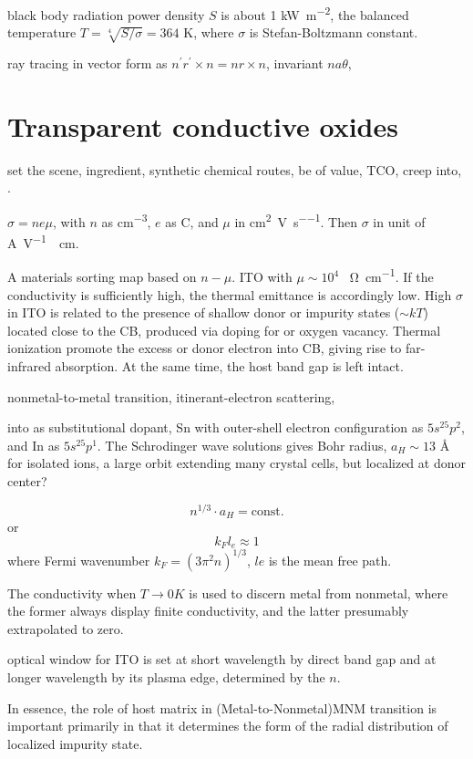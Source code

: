 black body radiation power density $S$ is about 1 \si{kW\per m^2}, the balanced temperature $T = \sqrt[4]{S/\sigma} = 364$ K, where $\sigma$ is Stefan-Boltzmann constant. 

ray tracing in vector form as $n^{\prime} r^{\prime} \times n = n r \times n$, invariant $na\theta$, 


\section{Transparent conductive oxides}

set the scene, ingredient, synthetic chemical routes, be of value, TCO, creep into, . \cite{Edwards2004}

$\sigma = ne\mu$, with $n$ as \si{cm^{-3}}, $e$ as C, and $\mu$ in \si{cm^2\per V\per s}. Then $\sigma$ in unit of \si{A\per V \per cm}. 

A materials sorting map based on $n-\mu$. ITO with $\mu\sim10^4$ \si{\per\ohm cm^{-1}}. If the conductivity is sufficiently high, the thermal emittance is accordingly low. High $\sigma$ in ITO is related to the presence of shallow donor or impurity states ($\sim kT$) located close to the  CB, produced via  doping for  or oxygen vacancy. Thermal ionization promote the excess or donor electron into CB, giving rise to far-infrared absorption. At the same time, the host band gap is left intact. 

nonmetal-to-metal transition, itinerant-electron scattering, 

 into  as substitutional dopant, Sn with outer-shell electron configuration as $5s^25p^2$, and In as $5s^25p^1$. The Schrodinger wave solutions gives Bohr radius, $a_H \sim 13$ \si{\angstrom} for isolated ions, a large orbit extending many crystal cells, but localized at donor center?

\[
n^{1/3}\cdot a_H = \text{const.}
\]
or 
\[
k_Fl_e \approx 1
\]
where Fermi wavenumber $k_F = (3\pi^2n)^{1/3}$, $le$ is the mean free path.
 
The conductivity when $T\rightarrow 0K$ is used to discern metal from nonmetal, where the former always display finite conductivity, and the latter presumably extrapolated to zero. 

optical window for ITO is set at short wavelength by direct band gap and at longer wavelength by its plasma edge, determined by the $n$. 

In essence, the role of host matrix in (Metal-to-Nonmetal)MNM transition is important primarily in that it determines the form of the radial distribution of localized impurity state.\cite{Edwards1978}

